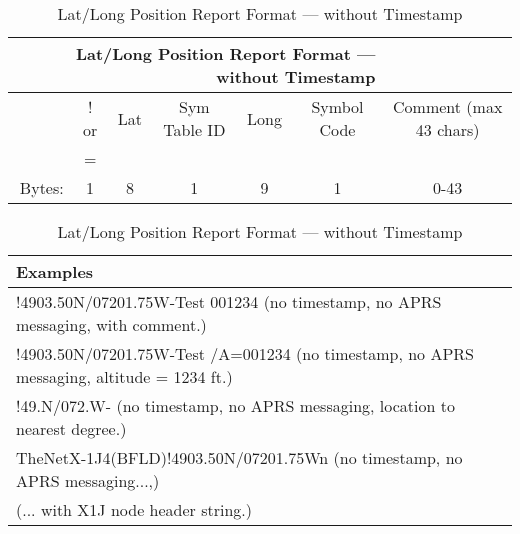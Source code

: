 \begin{table}[H]
  \begin{tabular}{r|c|c|c|c|c|c|}
    \hline
    \multicolumn {6}{r}{Lat/Long Position Report Format — without Timestamp} \\
    \hline
    & ! or & Lat & Sym Table ID & Long & Symbol Code & Comment (max 43 chars) \\
    & =    &     &              &      &             &                        \\
    \hline
    Bytes: & 1 & 8 & 1 & 9 & 1 & 0-43 \\
    \hline
  \end{tabular}
  
  \vspace{2em}

  \begin{tabular}{l}
    \multicolumn {1}{l}{Examples} \\
    \hline
    !4903.50N/07201.75W-Test \hspace{1ex} 001234 \hspace{1ex} (no timestamp, no APRS messaging, with comment.) \\
    !4903.50N/07201.75W-Test \hspace{1ex} /A=001234 \hspace{1ex} (no timestamp, no APRS messaging, altitude = 1234 ft.) \\
    !49\textvisiblespace\textvisiblespace.N/072\textvisiblespace\textvisiblespace.\textvisiblespace\textvisiblespace W- \hspace{1ex}  (no timestamp, no APRS messaging, location to nearest degree.) \\
    TheNet\textvisiblespace X-1J4\textvisiblespace\textvisiblespace(BFLD)!4903.50N/07201.75Wn  (no timestamp, no APRS messaging...,) \\
    \hspace{25ex}  (... with X1J node header string.) \\
    \hline
    \hline
  \end{tabular}
  \caption{Lat/Long Position Report Format — without Timestamp}
\end{table}

             
